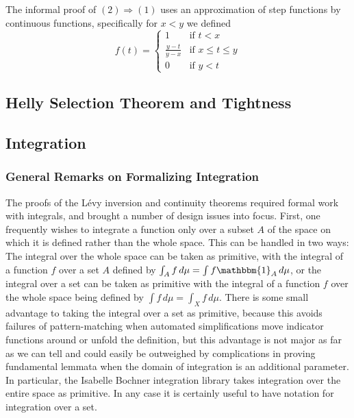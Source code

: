 \documentclass{article}
\theoremstyle{definition}
\begin{document}
\medskip

The informal proof of $(2) \Rightarrow (1)$ uses an approximation of step functions by continuous functions, specifically for $x < y$ we defined
\[ f(t) = \begin{cases} 1 & \text{if $t < x$} \\
                        \frac{y - t}{y - x} & \text{if $x \le t \le y$} \\
                        0 & \text{if $y < t$} \end{cases} \]

\subsection{Helly Selection Theorem and Tightness}



\subsection{Integration}

\subsubsection{General Remarks on Formalizing Integration}

The proofs of the L\'evy inversion and continuity theorems required formal work with integrals, and brought a number of design issues into focus. First, one frequently wishes to integrate a function only over a subset $A$ of the space on which it is defined rather than the whole space. This can be handled in two ways: The integral over the whole space can be taken as primitive, with the integral of a function $f$ over a set $A$ defined by $\int_A f \, d\mu = \int f \mathbbm{1}_A \, d\mu$, or the integral over a set can be taken as primitive with the integral of a function $f$ over the whole space being defined by $\int f \, d\mu = \int_X f \, d\mu$. There is some small advantage to taking the integral over a set as primitive, because this avoids failures of pattern-matching when automated simplifications move indicator functions around or unfold the definition, but this advantage is not major as far as we can tell and could easily be outweighed by complications in proving fundamental lemmata when the domain of integration is an additional parameter. In particular, the Isabelle Bochner integration library takes integration over the entire space as primitive. In any case it is certainly useful to have notation for integration over a set.
\end{document}
